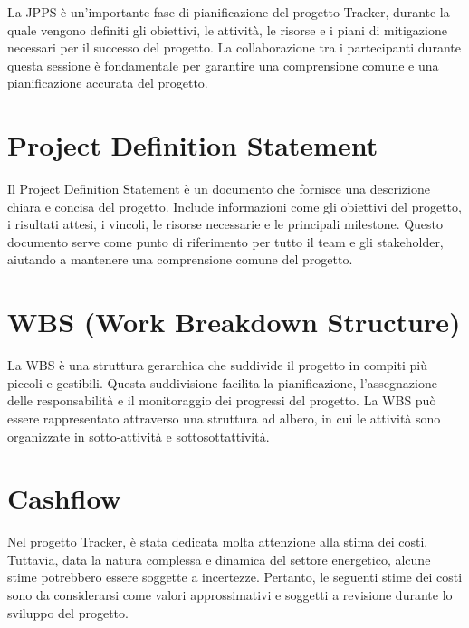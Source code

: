 \documentclass[oneside]{book}
\begin{document}
La JPPS è un'importante fase di pianificazione del progetto Tracker, durante la quale vengono definiti gli obiettivi, le attività, le risorse e i piani di mitigazione necessari per il successo del progetto. La collaborazione tra i partecipanti durante questa sessione è fondamentale per garantire una comprensione comune e una pianificazione accurata del progetto.







\section{Project Definition Statement}
Il Project Definition Statement è un documento che fornisce una descrizione chiara e concisa del progetto. Include informazioni come gli obiettivi del progetto, i risultati attesi, i vincoli, le risorse necessarie e le principali milestone. Questo documento serve come punto di riferimento per tutto il team e gli stakeholder, aiutando a mantenere una comprensione comune del progetto.

\section{WBS (Work Breakdown Structure)}
La WBS è una struttura gerarchica che suddivide il progetto in compiti più piccoli e gestibili. Questa suddivisione facilita la pianificazione, l'assegnazione delle responsabilità e il monitoraggio dei progressi del progetto. La WBS può essere rappresentato attraverso una struttura ad albero, in cui le attività sono organizzate in sotto-attività e sottosottattività.

\section{Cashflow}
Nel progetto Tracker, è stata dedicata molta attenzione alla stima dei costi. Tuttavia, data la natura complessa e dinamica del settore energetico, alcune stime potrebbero essere soggette a incertezze. \newline Pertanto, le seguenti stime dei costi sono da considerarsi come valori approssimativi e soggetti a revisione durante lo sviluppo del progetto.
\end{document}
